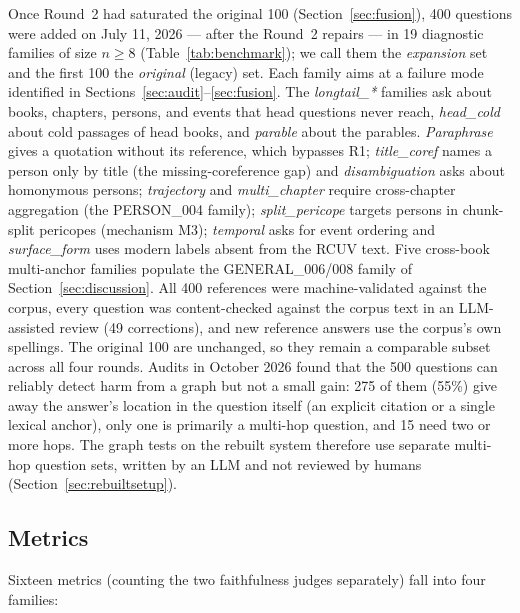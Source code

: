 Once Round~2 had saturated the original 100 (Section~\ref{sec:fusion}),
400 questions were added on July 11, 2026 --- after the Round~2
repairs --- in 19 diagnostic families of size $n \ge 8$
(Table~\ref{tab:benchmark}); we call them the \emph{expansion} set and
the first 100 the \emph{original} (legacy) set. Each family aims at a
failure mode identified in Sections~\ref{sec:audit}--\ref{sec:fusion}.
The \emph{longtail\_*} families ask about books, chapters, persons, and
events that head questions never reach, \emph{head\_cold} about cold
passages of head books, and \emph{parable} about the parables.
\emph{Paraphrase} gives a quotation without its reference, which
bypasses R1; \emph{title\_coref} names a person only by title (the
missing-coreference gap) and \emph{disambiguation} asks about
homonymous persons; \emph{trajectory} and \emph{multi\_chapter} require
cross-chapter aggregation (the PERSON\_004 family); \emph{split\_pericope}
targets persons in chunk-split pericopes (mechanism M3); \emph{temporal}
asks for event ordering and \emph{surface\_form} uses modern labels
absent from the RCUV text. Five cross-book multi-anchor families populate
the GENERAL\_006/008 family of Section~\ref{sec:discussion}. All 400
references were machine-validated against the corpus, every question
was content-checked against the corpus text in an LLM-assisted review
(49 corrections), and new reference answers use the corpus's own
spellings. The original 100 are unchanged, so they remain a comparable
subset across all four rounds. Audits in October 2026 found that the 500
questions can reliably detect harm from a graph but not a small gain:
275 of them (55\%) give away the answer's location in the question
itself (an explicit citation or a single lexical anchor), only one is
primarily a multi-hop question, and 15 need two or more hops. The graph
tests on the rebuilt system therefore use separate multi-hop question
sets, written by an LLM and not reviewed by humans
(Section~\ref{sec:rebuiltsetup}).

\subsection{Metrics}
\label{sec:evalmetrics}

Sixteen metrics (counting the two faithfulness judges separately) fall
into four families:

